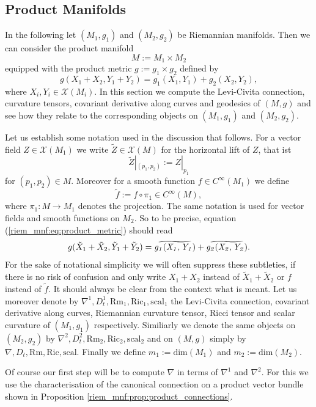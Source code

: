 \subsection{Product Manifolds}

In the following let $(M_1,g_1)$ and $(M_2,g_2)$ be Riemannian manifolds. Then we can consider the product manifold 
\[
M := M_1 \times M_2
\]
equipped with the product metric $g:= g_1 \times g_2$ defined by 
\begin{equation}
    \label{riem_mnf:eq:product_metric}
g(X_1+X_2,Y_1+Y_2) = g_1(X_1,Y_1) + g_2(X_2,Y_2),
\end{equation}
where $X_i,Y_i \in \mathscr{X}(M_i)$. In this section we compute the Levi-Civita connection, curvature tensors, covariant derivative along curves and geodesics of $(M,g)$ and see how they relate to the corresponding objects on $(M_1,g_1)$ and $(M_2,g_2)$.

Let us establish some notation used in the discussion that follows. For a vector field $Z \in \mathscr{X}(M_1)$ we write $\tilde{Z} \in \mathscr{X}(M)$ for the horizontal lift of $Z$, that ist 
\[
\tilde{Z}|_{(p_1,p_2)} := Z|_{p_1}
\]
for $(p_1,p_2) \in M$. Moreover for a smooth function $f \in C^\infty(M_1)$ we define 
\[
\tilde{f}:= f \circ \pi_1 \in C^\infty(M),
\]
where $\pi_1 \colon M \to M_1$ denotes the projection. The same notation is used for vector fields and smooth functions on $M_2$. So to be precise, equation (\ref{riem_mnf:eq:product_metric}) should read 
\[
g(\tilde{X}_1+\tilde{X}_2,\tilde{Y}_1+\tilde{Y}_2) = \reallywidetilde{\mathit{g_1(X_1,Y_1)}}{7} + \reallywidetilde{\mathit{g_2(X_2,Y_2)}}{7}.
\]
For the sake of notational simplicity we will often suppress these subtleties, if there is no risk of confusion and only write $X_1 + X_2$ instead of $\tilde{X}_1+\tilde{X}_2$ or $f$ instead of $\tilde{f}$. It should always be clear from the context what is meant. Let us moreover denote by $\nabla^1,D_t^1,\mathrm{Rm}_1,\mathrm{Ric}_1,\mathrm{scal}_1$ the Levi-Civita connection, covariant derivative along curves, Riemannian curvature tensor, Ricci tensor and scalar curvature of $(M_1,g_1)$ respectively. Similiarly we denote the same objects on $(M_2,g_2)$ by $\nabla^2,D_t^2,\mathrm{Rm}_2,\mathrm{Ric}_2,\mathrm{scal}_2$ and on $(M,g)$ simply by $\nabla,D_t,\mathrm{Rm},\mathrm{Ric},\mathrm{scal}$. Finally we define $m_1 := \mathrm{dim}(M_1)$ and $m_2 := \mathrm{dim}(M_2)$.

Of course our first step will be to compute $\nabla$ in terms of $\nabla^1$ and $\nabla^2$. For this we use the characterisation of the canonical connection on a product vector bundle shown in Proposition \ref{riem_mnf:prop:product_connections}.


